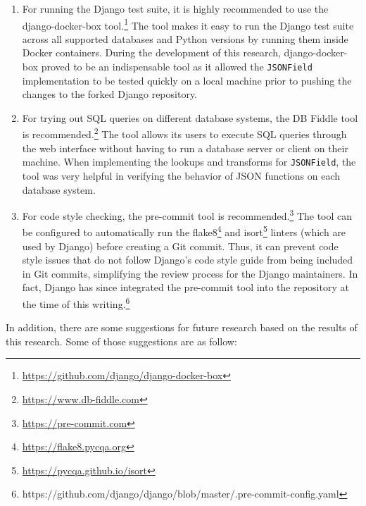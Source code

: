 \begin{enumerate}
	\item  For running the Django test suite, it is highly recommended to use
	       the django-docker-box
	       tool.\footnote{\url{https://github.com/django/django-docker-box}}
	       The tool makes it easy to run the Django test suite across all
	       supported databases and Python versions by running them inside
	       Docker containers. During the development of this research,
	       django-docker-box proved to be an indispensable tool as it allowed
	       the \verb|JSONField| implementation to be tested quickly on a local
	       machine prior to pushing the changes to the forked Django
	       repository.
	\item  For trying out SQL queries on different database systems, the DB
		   Fiddle tool is
		   recommended.\footnote{\url{https://www.db-fiddle.com}} The tool
		   allows its users to execute SQL queries through the web interface
		   without having to run a database server or client on their machine.
		   When implementing the lookups and transforms for \verb|JSONField|,
		   the tool was very helpful in verifying the behavior of JSON
		   functions on each database system.
	\item  For code style checking, the pre-commit tool is
		   recommended.\footnote{\url{https://pre-commit.com}} The tool can be
		   configured to automatically run the
		   flake8\footnote{\url{https://flake8.pycqa.org}} and
		   isort\footnote{\url{https://pycqa.github.io/isort}} linters (which
		   are used by Django) before creating a Git commit. Thus, it can
		   prevent code style issues that do not follow Django's code style
		   guide from being included in Git commits, simplifying the review
		   process for the Django maintainers. In fact, Django has since
		   integrated the pre-commit tool into the repository at the time of
		   this writing.\footnote{https://github.com/django/django/blob/master/.pre-commit-config.yaml}
\end{enumerate}

In addition, there are some suggestions for future research based on the
results of this research. Some of those suggestions are as follow:

